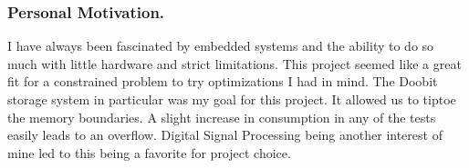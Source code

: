 \subsubsection{Personal Motivation.}

I have always been fascinated by embedded systems and the ability to do so much
with little hardware and strict limitations. This project seemed like a great
fit for a constrained problem to try optimizations I had in mind. The Doobit
storage system in particular was my goal for this project. It allowed us to
tiptoe the memory boundaries. A slight increase in consumption in any of the
tests easily leads to an overflow. Digital Signal Processing being another
interest of mine led to this being a favorite for project choice.